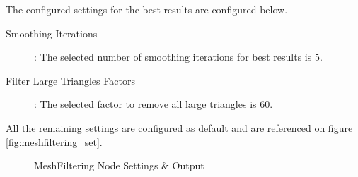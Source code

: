 \documentclass[12pt]{report}
\begin{document}
The configured settings for the best results are configured below.

\begin{description}
  \item[Smoothing Iterations]: The selected number of smoothing iterations for best results is $5$.
  \item[Filter Large Triangles Factors]: The selected factor to remove all large triangles is $60$.  
\end{description}

All the remaining settings are configured as default and are referenced on figure \ref{fig:meshfiltering_set}.
\begin{figure}[H]%
  \centering
  \qquad
\caption{MeshFiltering Node Settings \& Output}
\label{fig:MeshFiltering_settings} 
\end{figure}
\end{document}
